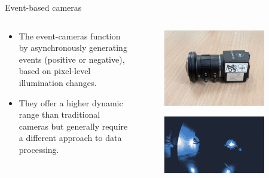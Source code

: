 \documentclass{beamer}
\begin{document}
\begin{frame}{Event-based cameras}

\begin{columns}[T]

\begin{column}{0.48\textwidth}
\vspace{0.3cm}
\begin{itemize}
    \item The event-cameras function by asynchronously generating events (positive or negative), based on pixel-level illumination changes.
    \item They offer a higher dynamic range than traditional cameras but generally require a different approach to data processing.
\end{itemize}

\end{column}

\begin{column}{0.48\textwidth}

    \begin{figure}[H]
        \centering
        \includegraphics[width=0.85\textwidth]{../fig/photos/evk4.jpg}
        \label{fig:eventcameras1}
    \end{figure}

    \begin{figure}[H]
        \centering
        \includegraphics[width=0.85\textwidth]{../fig/photos/meas1.png}
        \label{fig:eventcameras2}
    \end{figure}

\end{column}

\end{columns}

\end{frame}
\end{document}
